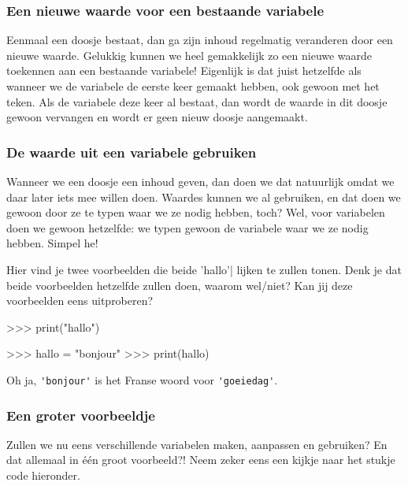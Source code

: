 \subsubsection{Een nieuwe waarde voor een bestaande variabele}

Eenmaal een doosje bestaat,
dan ga zijn inhoud regelmatig veranderen door een nieuwe waarde.
Gelukkig kunnen we heel gemakkelijk zo een nieuwe waarde toekennen aan een bestaande variabele!
Eigenlijk is dat juist hetzelfde als wanneer we de variabele de eerste keer gemaakt hebben,
ook gewoon met het \pySnip{=} teken.
Als de variabele deze keer al bestaat,
dan wordt de waarde in dit doosje gewoon vervangen en wordt er geen nieuw doosje aangemaakt.

\subsubsection{De waarde uit een variabele gebruiken}

Wanneer we een doosje een inhoud geven,
dan doen we dat natuurlijk omdat we daar later iets mee willen doen.
Waardes kunnen we al gebruiken,
en dat doen we gewoon door ze te typen waar we ze nodig hebben, toch?
Wel, voor variabelen doen we gewoon hetzelfde:
we typen gewoon de variabele waar we ze nodig hebben.
Simpel he!

\begin{letsTryOut}
	Hier vind je twee voorbeelden die beide 'hallo'| lijken te zullen tonen.
	Denk je dat beide voorbeelden hetzelfde zullen doen, waarom wel/niet?
	\newline
	Kan jij deze voorbeelden eens uitproberen?
\begin{pyEnv}
>>> print("hallo")
\end{pyEnv}
\begin{pyEnv}
>>> hallo = "bonjour"
>>> print(hallo)
\end{pyEnv}
	Oh ja, \verb|'bonjour'| is het Franse woord voor \verb|'goeiedag'|.
\end{letsTryOut}

\subsubsection{Een groter voorbeeldje}

Zullen we nu eens verschillende variabelen maken, aanpassen en gebruiken?
En dat allemaal in \'e\'en groot voorbeeld?!
Neem zeker eens een kijkje naar het stukje code hieronder.

